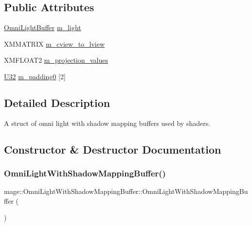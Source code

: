 \subsection*{Public Attributes}
\begin{DoxyCompactItemize}
\item 
\hyperlink{structmage_1_1_omni_light_buffer}{Omni\+Light\+Buffer} \hyperlink{structmage_1_1_omni_light_with_shadow_mapping_buffer_ad04cdb09bc31de362f8f4f75aa5b6aea}{m\+\_\+light}
\item 
X\+M\+M\+A\+T\+R\+IX \hyperlink{structmage_1_1_omni_light_with_shadow_mapping_buffer_ac8818649198198519826adf18fe0da7d}{m\+\_\+cview\+\_\+to\+\_\+lview}
\item 
X\+M\+F\+L\+O\+A\+T2 \hyperlink{structmage_1_1_omni_light_with_shadow_mapping_buffer_afd75d76a4713da8430e0c0080602e0b7}{m\+\_\+projection\+\_\+values}
\item 
\hyperlink{namespacemage_a41c104c036fba3756a74e19f793eeaa1}{U32} \hyperlink{structmage_1_1_omni_light_with_shadow_mapping_buffer_aaaf8cc62c3bb6607d2efb6c0b5069f87}{m\+\_\+padding0} \mbox{[}2\mbox{]}
\end{DoxyCompactItemize}


\subsection{Detailed Description}
A struct of omni light with shadow mapping buffers used by shaders. 

\subsection{Constructor \& Destructor Documentation}
\hypertarget{structmage_1_1_omni_light_with_shadow_mapping_buffer_a02ade96988185cc3b0f24f4618534935}{}\label{structmage_1_1_omni_light_with_shadow_mapping_buffer_a02ade96988185cc3b0f24f4618534935} 
\subsubsection{\texorpdfstring{Omni\+Light\+With\+Shadow\+Mapping\+Buffer()}{OmniLightWithShadowMappingBuffer()}\hspace{0.1cm}{\footnotesize\ttfamily [1/3]}}
{\footnotesize\ttfamily mage\+::\+Omni\+Light\+With\+Shadow\+Mapping\+Buffer\+::\+Omni\+Light\+With\+Shadow\+Mapping\+Buffer (\begin{DoxyParamCaption}{ }\end{DoxyParamCaption})}

